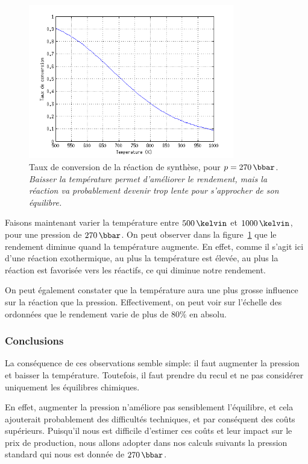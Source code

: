 \begin{figure}
    \centering
    \includegraphics[width=0.8\textwidth]{img/param-temp}
    \caption{
        Taux de conversion de la réaction de synthèse,
        pour $p=270\,\bbar$.
        \emph{Baisser la température permet d'améliorer le rendement,
        mais la réaction va probablement devenir trop lente pour s'approcher
        de son équilibre.}
    }
    \label{fig:param-temp}
\end{figure}

Faisons maintenant varier la température entre $500\,\kelvin$ et $1000\,\kelvin$, pour une pression de $270\,\bbar$.
On peut observer dans la figure~\ref{fig:param-temp} que le rendement diminue quand la température augmente. En effet, comme il s'agit ici d'une réaction exothermique, au plus la température est élevée, au plus la réaction est favorisée vers les réactifs, ce qui diminue notre rendement.

On peut également constater que la température aura une plus grosse influence sur la réaction que la pression. Effectivement, on peut voir sur l'échelle des ordonnées que le rendement varie de plus de $80\%$ en absolu.

\subsubsection{Conclusions}

La conséquence de ces observations semble simple:
il faut augmenter la pression et baisser la température.
Toutefois, il faut prendre du recul et ne pas considérer uniquement
les équilibres chimiques.

En effet, augmenter la pression n'améliore pas sensiblement l'équilibre,
et cela ajouterait probablement des difficultés techniques, et par conséquent
des coûts supérieurs. Puisqu'il nous est difficile d'estimer ces coûts et leur
impact sur le prix de production, nous allons adopter dans nos calculs suivants
la pression standard qui nous est donnée de $270\,\bbar$.

